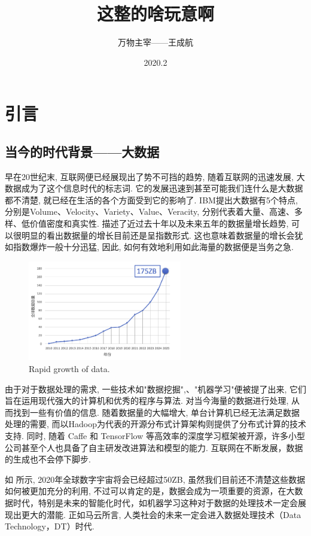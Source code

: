 \documentclass[lang=cn,11pt,a4paper]{elegantpaper}
\title{这整的啥玩意啊}
\author{万物主宰——王成航}
\date{2020.2}
\begin{document}
\maketitle
\tableofcontents
\thispagestyle{empty}
\newpage
{}
\section{引言}
\subsection{当今的时代背景——大数据}
\par 早在20世纪末, 互联网便已经展现出了势不可挡的趋势, 随着互联网的迅速发展, 大数据成为了这个信息时代的标志词. 它的发展迅速到甚至可能我们连什么是大数据都不清楚, 就已经在生活的各个方面受到它的影响了. IBM提出大数据有5个特点, 分别是Volume、Velocity、Variety、Value、Veracity, 分别代表着大量、高速、多样、低价值密度和真实性.  描述了近过去十年以及未来五年的数据量增长趋势, 可以很明显的看出数据量的增长目前还是呈指数形式. 这也意味着数据量的增长会犹如指数爆炸一般十分迅猛, 因此, 如何有效地利用如此海量的数据便是当务之急. 
\begin{figure}[htbp]
	\centering
	\includegraphics[width=0.6\textwidth]{Bigdata}
  	\caption{Rapid growth of data.\label{fig:data}}
\end{figure}
\par 由于对于数据处理的需求, 一些技术如"数据挖掘",、"机器学习"便被提了出来, 它们旨在运用现代强大的计算机和优秀的程序与算法. 对当今海量的数据进行处理, 从而找到一些有价值的信息. 随着数据量的大幅增大, 单台计算机已经无法满足数据处理的需要, 而以Hadoop为代表的开源分布式计算架构则提供了分布式计算的技术支持. 同时, 随着 Caffe 和 TensorFlow 等高效率的深度学习框架被开源，许多小型公司甚至个人也具备了自主研发改进算法和模型的能力. 互联网在不断发展，数据的生成也不会停下脚步. 
\par 如 所示, 2020年全球数字宇宙将会已经超过50ZB, 虽然我们目前还不清楚这些数据如何被更加充分的利用, 不过可以肯定的是，数据会成为一项重要的资源，在大数据时代，特别是未来的智能化时代，如机器学习这种对于数据的处理技术一定会展现出更大的潜能. 正如马云所言, 人类社会的未来一定会进入数据处理技术（Data Technology，DT）时代.
\end{document}
